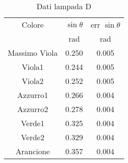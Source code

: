 \begin{table}[H]
\begin{center}
\caption{Dati lampada D}
\begin{tabular}{|c|cc|}
\hline
Colore	&	$\sin \theta$	&	err $\sin \theta$	\\
	&	rad	&	rad	\\ \hline
Massimo Viola	&	0.250	&	0.005	\\
Viola1	&	0.244	&	0.005	\\
Viola2	&	0.252	&	0.005	\\
Azzurro1	&	0.266	&	0.004	\\
Azzurro2	&	0.278	&	0.004	\\
Verde1	&	0.325	&	0.004	\\
Verde2	&	0.329	&	0.004	\\
Arancione	&	0.357	&	0.004	\\ \hline
\end{tabular}
\end{center}
\label{label}
\end{table}
